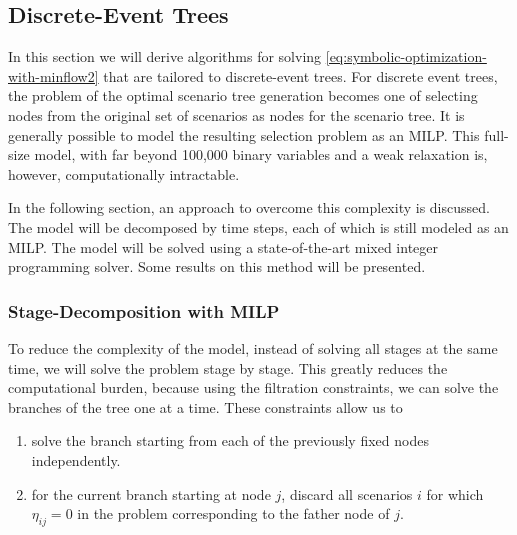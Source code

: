 \subsection{Discrete-Event Trees}
\label{sec:MILP-selection-problem}
In this section we will derive algorithms for solving \eqref{eq:symbolic-optimization-with-minflow2} that are tailored to discrete-event trees.
For discrete event trees, the problem of the optimal scenario tree generation becomes one of selecting nodes from the original set of scenarios as nodes for the scenario tree.
It is generally possible to model the resulting selection problem as an MILP.
This full-size model, with far beyond 100,000 binary variables and a weak relaxation is, however, computationally intractable.

In the following section, an approach to overcome this complexity is discussed.
The model will be decomposed by time steps, each of which is still modeled as an MILP.
The model will be solved using a state-of-the-art mixed integer programming solver.
Some results on this method will be presented.
%
\subsubsection{Stage-Decomposition with MILP}
%
To reduce the complexity of the model, instead of solving all stages at the same time, we will solve the problem stage by stage.
This greatly reduces the computational burden, because using the filtration constraints, we can solve the branches of the tree one at a time.
These constraints allow us to
\begin{enumerate}
\item solve the branch starting from each of the previously fixed nodes independently.
\item for the current branch starting at node $j$, discard all scenarios $i$ for which $\eta_{ij}=0$ in the problem corresponding to the father node of $j$.
\end{enumerate}

